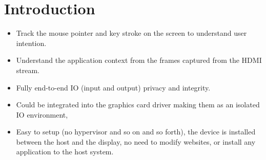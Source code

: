 \section{Introduction}
\label{sec:intro}

\begin{itemize}
  \item Track the mouse pointer and key stroke on the screen to understand user intention.
  \item Understand the application context from the frames captured from the HDMI stream.
  \item Fully end-to-end IO (input and output) privacy and integrity.
  \item Could be integrated into the graphics card driver making them as an isolated IO environment,
  \item Easy to setup (no hypervisor and so on and so forth), the device is installed between the host and the display, no need to modify websites, or install any application to the host system.
\end{itemize}